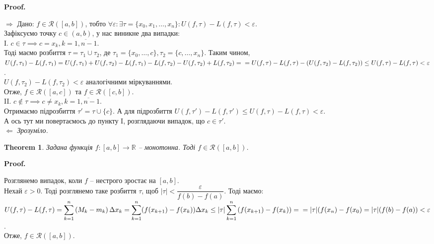 \documentclass[a4paper, 10pt]{article}
\makeatletter
\def\huge{\displaystyle}
\def\rightproof{$\boxed{\Rightarrow}$ }
\def\leftproof{$\boxed{\Leftarrow}$ }
\theoremstyle{theoremdd}
\newtheorem{theorem}{Theorem}[subsection]
\theoremstyle{theoremdd}
\theoremstyle{theoremdd}
\theoremstyle{theoremdd}
\theoremstyle{theoremdd}
\theoremstyle{theoremdd}
\theoremstyle{theoremdd}
\theoremstyle{theoremdd}
\theoremstyle{theoremdd}
\renewenvironment{proof}[1][Proof.\\]{\par
\pushQED{\hfill \qed}%
\normalfont \topsep6\p@\@plus6\p@\relax
\trivlist
\item\relax
{\bfseries
#1\@addpunct{.}}\hspace\labelsep\ignorespaces
}{%
\popQED\endtrivlist\@endpefalse
}
\makeatother
\begin{document}
\begin{proof}
\rightproof Дано: $f \in \mathcal{R}([a,b])$, тобто $\forall \varepsilon: \exists \tau = \{x_0,x_1,\dots,x_n\}: U(f, \tau) - L(f,\tau) < \varepsilon$.\\
Зафіксуємо точку $c \in (a,b)$, у нас виникне два випадки:\\
I. $c \in \tau \implies c = x_k, k = \overline{1,n-1}$. \\
Тоді маємо розбиття $\tau = \tau_1 \cup \tau_2$, де $\tau_1 = \{x_0,\dots,c\}, \tau_2 = \{c,\dots,x_n\}$. Таким чином,\\
$U(f,\tau_1) - L(f,\tau_1) = U(f,\tau_1) + U(f,\tau_2) - L(f,\tau_1) - L(f,\tau_2) - U(f,\tau_2) + L(f,\tau_2) =  \\ = U(f, \tau) - L(f,\tau) - (U(f,\tau_2) - L(f,\tau_2)) \leq U(f, \tau) - L(f,\tau) < \varepsilon$.\\
$U(f,\tau_2) - L(f,\tau_2) < \varepsilon$ аналогічними міркуваннями.\\
Отже, $f \in \mathcal{R}([a,c])$ та $f \in \mathcal{R}([c,b])$.
\bigskip \\
II. $c \not\in \tau \implies c \neq x_k, k = \overline{1,n-1}$. \\
Отримаємо підрозбиття $\tau' = \tau \cup \{c\}$. А для підрозбиття $U(f,\tau') - L(f,\tau') \leq U(f,\tau) - L(f,\tau) < \varepsilon$.\\
А ось тут ми повертаємось до пункту I, розглядаючи випадок, що $c \in \tau'$.
\bigskip \\
\leftproof \textit{Зрозуміло.}
\end{proof}

\begin{theorem}
Задана функція $f \colon [a,b] \to \mathbb{R}$ -- монотонна. Тоді $f \in \mathcal{R}([a,b])$.
\end{theorem}

\begin{proof}
Розглянемо випадок, коли $f$ -- нестрого зростає на $[a,b]$.\\
Нехай $\varepsilon > 0$. Тоді розглянемо таке розбиття $\tau$, щоб $|\tau| < \dfrac{\varepsilon}{f(b)-f(a)}$. Тоді маємо:\\
$U(f,\tau) - L(f,\tau) = \huge\sum_{k=1}^n \left( M_k - m_k \right) \Delta x_k = \sum_{k=1}^n (f(x_{k+1})-f(x_k))\Delta x_k \leq |\tau| \huge\sum_{k=1}^{n} \left( f(x_{k+1})-f(x_k) \right) = \\ = |\tau| (f(x_n)-f(x_0) = |\tau| (f(b)-f(a)) < \varepsilon$.\\
Отже, $f \in \mathcal{R}([a,b])$.
\end{proof}
\end{document}

